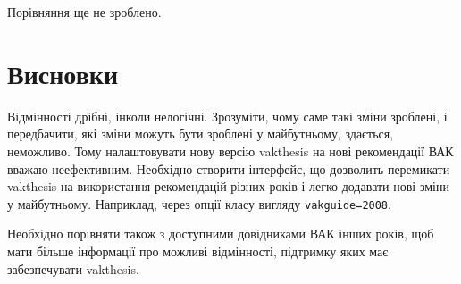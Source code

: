 \documentclass[a4paper]{article}
\newcommand{\vakthesis}{\textsf{vakthesis}}
\begin{document}
Порівняння ще не зроблено.

\section{Висновки}

Відмінності дрібні, інколи нелогічні. Зрозуміти, чому саме такі зміни
зроблені, і передбачити, які зміни можуть бути зроблені у майбутньому,
здається, неможливо. Тому налаштовувати нову версію \vakthesis{} на
нові рекомендації ВАК вважаю неефективним. Необхідно створити
інтерфейс, що дозволить перемикати \vakthesis{} на використання
рекомендацій різних років і легко додавати нові зміни у
майбутньому. Наприклад, через опції класу вигляду
\verb|vakguide=2008|.

Необхідно порівняти також з доступними довідниками ВАК інших років,
щоб мати більше інформації про можливі відмінності, підтримку яких має
забезпечувати \vakthesis{}.
\end{document}
